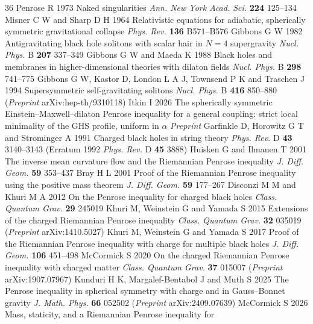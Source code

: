 \documentclass[11pt]{article}
\theoremstyle{plain}
\theoremstyle{definition}
\begin{document}
\begin{thebibliography}{36}
 Penrose R 1973 Naked singularities \emph{Ann. New York Acad. Sci.} \textbf{224} 125--134
 Misner C W and Sharp D H 1964 Relativistic equations for adiabatic, spherically
  symmetric gravitational collapse \emph{Phys. Rev.} \textbf{136} B571--B576
 Gibbons G W 1982 Antigravitating black hole solitons with scalar hair in $N=4$
  supergravity \emph{Nucl. Phys.} B \textbf{207} 337--349
 Gibbons G W and Maeda K 1988 Black holes and membranes in higher-dimensional
  theories with dilaton fields \emph{Nucl. Phys.} B \textbf{298} 741--775
 Gibbons G W, Kastor D, London L A J, Townsend P K and Traschen J 1994 Supersymmetric
  self-gravitating solitons \emph{Nucl. Phys.} B \textbf{416} 850--880 (\emph{Preprint} arXiv:hep-th/9310118)
 Itkin I 2026 The spherically symmetric Einstein--Maxwell--dilaton Penrose
  inequality for a general coupling: strict local minimality of the GHS profile, uniform in $\alpha$
  \emph{Preprint}
 Garfinkle D, Horowitz G T and Strominger A 1991 Charged black holes in string theory
  \emph{Phys. Rev.} D \textbf{43} 3140--3143 (Erratum 1992 \emph{Phys. Rev.} D \textbf{45} 3888)
 Huisken G and Ilmanen T 2001 The inverse mean curvature flow and the Riemannian
  Penrose inequality \emph{J. Diff. Geom.} \textbf{59} 353--437
 Bray H L 2001 Proof of the Riemannian Penrose inequality using the positive mass theorem
  \emph{J. Diff. Geom.} \textbf{59} 177--267
 Disconzi M M and Khuri M A 2012 On the Penrose inequality for charged black holes
  \emph{Class. Quantum Grav.} \textbf{29} 245019
 Khuri M, Weinstein G and Yamada S 2015 Extensions of the charged Riemannian Penrose
  inequality \emph{Class. Quantum Grav.} \textbf{32} 035019 (\emph{Preprint} arXiv:1410.5027)
 Khuri M, Weinstein G and Yamada S 2017 Proof of the Riemannian Penrose inequality with
  charge for multiple black holes \emph{J. Diff. Geom.} \textbf{106} 451--498
 McCormick S 2020 On the charged Riemannian Penrose inequality with charged matter
  \emph{Class. Quantum Grav.} \textbf{37} 015007 (\emph{Preprint} arXiv:1907.07967)
 Kunduri H K, Margalef-Bentabol J and Muth S 2025 The Penrose inequality in spherical
  symmetry with charge and in Gauss--Bonnet gravity \emph{J. Math. Phys.} \textbf{66} 052502 (\emph{Preprint} arXiv:2409.07639)
 McCormick S 2026 Mass, staticity, and a Riemannian Penrose inequality for

\end{thebibliography}
\end{document}
